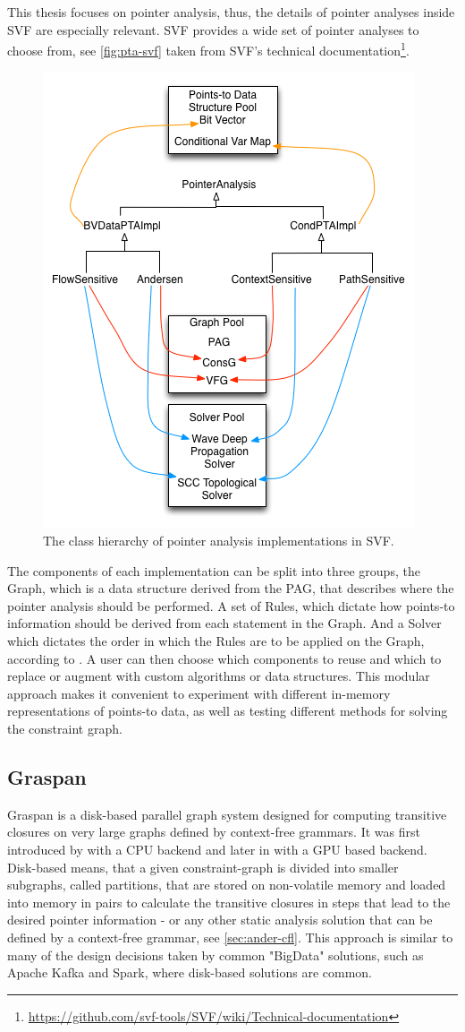 This thesis focuses on pointer analysis, thus, the details of pointer analyses inside SVF are especially relevant. SVF provides a wide set of pointer analyses to choose from, see \autoref{fig:pta-svf} taken from SVF's technical documentation\footnote{\url{https://github.com/svf-tools/SVF/wiki/Technical-documentation}}.
\begin{figure}
    \centering
    \includegraphics[width=.6\textwidth]{img/pta-svf.png}
    \caption{The class hierarchy of pointer analysis implementations in SVF.}
    \label{fig:pta-svf}
\end{figure}
The components of each implementation can be split into three groups, the Graph, which is a data structure derived from the PAG, that describes where the pointer analysis should be performed.
A set of Rules, which dictate how points-to information should be derived from each statement in the Graph. And a Solver which dictates the order in which the Rules are to be applied on the Graph, according to \cite{sui2016svf}.
A user can then choose which components to reuse and which to replace or augment with custom algorithms or data structures.
This modular approach makes it convenient to experiment with different in-memory representations of points-to data, as well as testing different methods for solving the constraint graph.
\subsection{Graspan}\label{sec:graspan}
Graspan is a disk-based parallel graph system designed for computing transitive closures on very large graphs defined by context-free grammars. It was first introduced by \cite{wang2017graspan} with a CPU backend and later in \cite{zuo2021systemizing} with a GPU based backend.
Disk-based means, that a given constraint-graph is divided into smaller subgraphs, called partitions, that are stored on non-volatile memory and loaded into memory in pairs to calculate the transitive closures in steps that lead to the desired pointer information - or any other static analysis solution that can be defined by a context-free grammar, see \autoref{sec:ander-cfl}.
This approach is similar to many of the design decisions taken by common "BigData" solutions, such as Apache Kafka and Spark, where disk-based solutions are common.

